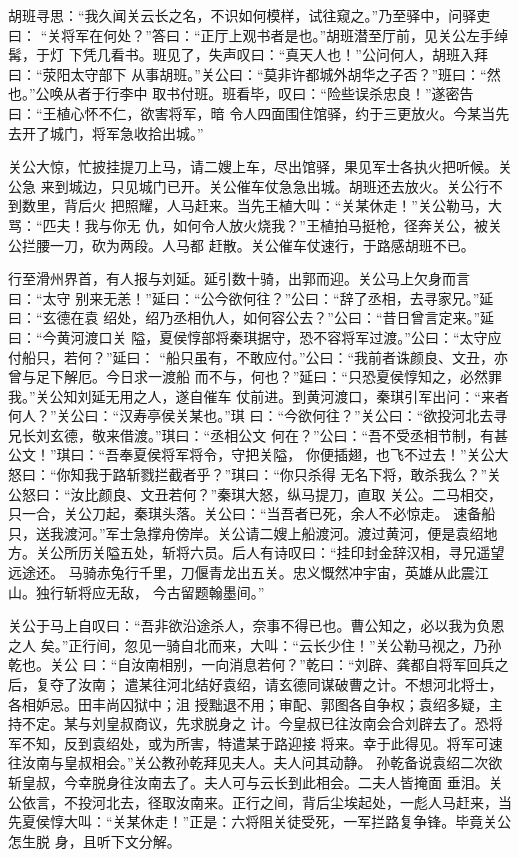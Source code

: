 胡班寻思：“我久闻关云长之名，不识如何模样，试往窥之。”乃至驿中，问驿吏曰：
“关将军在何处？”答曰：“正厅上观书者是也。”胡班潜至厅前，见关公左手绰髯，于灯
下凭几看书。班见了，失声叹曰：“真天人也！”公问何人，胡班入拜曰：“荥阳太守部下
从事胡班。”关公曰：“莫非许都城外胡华之子否？”班曰：“然也。”公唤从者于行李中
取书付班。班看毕，叹曰：“险些误杀忠良！”遂密告曰：“王植心怀不仁，欲害将军，暗
令人四面围住馆驿，约于三更放火。今某当先去开了城门，将军急收拾出城。”

关公大惊，忙披挂提刀上马，请二嫂上车，尽出馆驿，果见军士各执火把听候。关公急
来到城边，只见城门已开。关公催车仗急急出城。胡班还去放火。关公行不到数里，背后火
把照耀，人马赶来。当先王植大叫：“关某休走！”关公勒马，大骂：“匹夫！我与你无
仇，如何令人放火烧我？”王植拍马挺枪，径奔关公，被关公拦腰一刀，砍为两段。人马都
赶散。关公催车仗速行，于路感胡班不已。

行至滑州界首，有人报与刘延。延引数十骑，出郭而迎。关公马上欠身而言曰：“太守
别来无恙！”延曰：“公今欲何往？”公曰：“辞了丞相，去寻家兄。”延曰：“玄德在袁
绍处，绍乃丞相仇人，如何容公去？”公曰：“昔日曾言定来。”延曰：“今黄河渡口关
隘，夏侯惇部将秦琪据守，恐不容将军过渡。”公曰：“太守应付船只，若何？”延曰：
“船只虽有，不敢应付。”公曰：“我前者诛颜良、文丑，亦曾与足下解厄。今日求一渡船
而不与，何也？”延曰：“只恐夏侯惇知之，必然罪我。”关公知刘延无用之人，遂自催车
仗前进。到黄河渡口，秦琪引军出问：“来者何人？”关公曰：“汉寿亭侯关某也。”琪
曰：“今欲何往？”关公曰：“欲投河北去寻兄长刘玄德，敬来借渡。”琪曰：“丞相公文
何在？”公曰：“吾不受丞相节制，有甚公文！”琪曰：“吾奉夏侯将军将令，守把关隘，
你便插翅，也飞不过去！”关公大怒曰：“你知我于路斩戮拦截者乎？”琪曰：“你只杀得
无名下将，敢杀我么？”关公怒曰：“汝比颜良、文丑若何？”秦琪大怒，纵马提刀，直取
关公。二马相交，只一合，关公刀起，秦琪头落。关公曰：“当吾者已死，余人不必惊走。
速备船只，送我渡河。”军士急撑舟傍岸。关公请二嫂上船渡河。渡过黄河，便是袁绍地
方。关公所历关隘五处，斩将六员。后人有诗叹曰：“挂印封金辞汉相，寻兄遥望远途还。
马骑赤兔行千里，刀偃青龙出五关。忠义慨然冲宇宙，英雄从此震江山。独行斩将应无敌，
今古留题翰墨间。”

关公于马上自叹曰：“吾非欲沿途杀人，奈事不得已也。曹公知之，必以我为负恩之人
矣。”正行间，忽见一骑自北而来，大叫：“云长少住！”关公勒马视之，乃孙乾也。关公
曰：“自汝南相别，一向消息若何？”乾曰：“刘辟、龚都自将军回兵之后，复夺了汝南；
遣某往河北结好袁绍，请玄德同谋破曹之计。不想河北将士，各相妒忌。田丰尚囚狱中；沮
授黜退不用；审配、郭图各自争权；袁绍多疑，主持不定。某与刘皇叔商议，先求脱身之
计。今皇叔已往汝南会合刘辟去了。恐将军不知，反到袁绍处，或为所害，特遣某于路迎接
将来。幸于此得见。将军可速往汝南与皇叔相会。”关公教孙乾拜见夫人。夫人问其动静。
孙乾备说袁绍二次欲斩皇叔，今幸脱身往汝南去了。夫人可与云长到此相会。二夫人皆掩面
垂泪。关公依言，不投河北去，径取汝南来。正行之间，背后尘埃起处，一彪人马赶来，当
先夏侯惇大叫：“关某休走！”正是：六将阻关徒受死，一军拦路复争锋。毕竟关公怎生脱
身，且听下文分解。